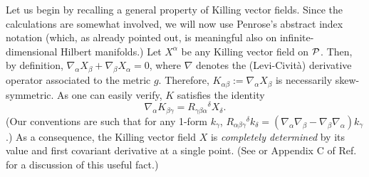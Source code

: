 \documentclass[12pt,aps,eqsecnum,tighten,nofootinbib]{revtex4-2}
\def\be{\begin{equation}}
\def\ee{\end{equation}}
\def\a{\alpha}
\def\b{\beta}
\def\c{\gamma}
\def\de{\delta}
\def\grad{\nabla}
\def\P{{\cal P}}
\begin{document}
Let us begin by recalling a general property of Killing vector fields.
Since the calculations are somewhat involved, we will now use
Penrose's abstract index notation (which, as already pointed out, is
meaningful also on infinite-dimensional Hilbert manifolds.)  Let
$X^\a$ be any Killing vector field on $\P$.  Then, by definition,
$\grad_\a X_\b + \grad_\b X_\a = 0$, where $\grad$ denotes the
(Levi-Civit\`a) derivative operator associated to the metric $g$.
Therefore, $K_{\a\b} := \grad_\a X_\b$ is necessarily skew-symmetric.
As one can easily verify,\cite{wald} $K$ satisfies the identity%
%
\be
\grad_\a K_{\b\c} = R_{\c\b\a}{}^\de X_\de.
\ee
%
(Our conventions are such that for any 1-form $k_\c$,
$R_{\a\b\c}{}^\delta k_\delta = (\grad_\a \grad_\b - \grad_\b
\grad_\a) k_\c$.)  As a consequence, the Killing vector field $X$ is
{\em completely determined} by its value and first covariant
derivative at a single point.  (See \cite{ashtekar} or Appendix C of
Ref.~\cite{wald} for a discussion of this useful fact.)
\end{document}
